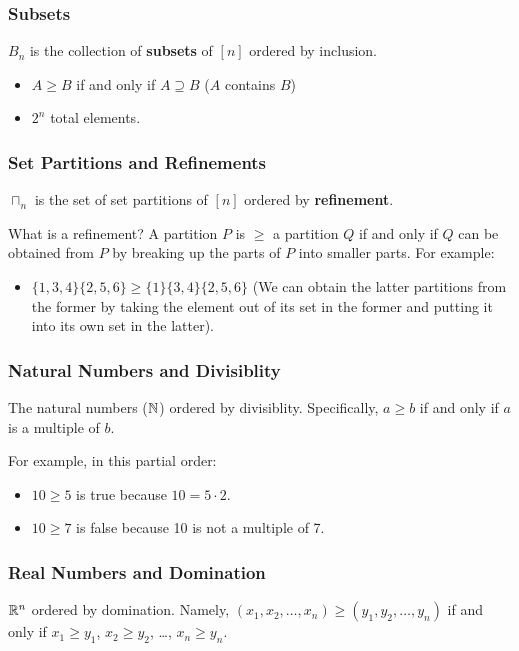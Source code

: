 \documentclass[letterpaper]{article}
\begin{document}
\subsubsection{Subsets}
$B_n$ is the collection of \textbf{subsets} of $[n]$ ordered by inclusion. 
\begin{itemize}
    \item $A \geq B$ if and only if $A \supseteq B$ ($A$ contains $B$)
    \item $2^n$ total elements. 
\end{itemize}

\subsubsection{Set Partitions and Refinements}
$\sqcap_n$ is the set of set partitions of $[n]$ ordered by \textbf{refinement}. 

\bigskip 

What is a refinement? A partition $P$ is $\geq$ a partition $Q$ if and only if $Q$ can be obtained from $P$ by breaking up the parts of $P$ into smaller parts. For example:
\begin{itemize}
    \item $\{1, 3, 4\}\{2, 5, 6\} \geq \{1\} \{3, 4\}\{2, 5, 6\}$ (We can obtain the latter partitions from the former by taking the element  out of its set in the former and putting it into its own set in the latter). 
\end{itemize}

\subsubsection{Natural Numbers and Divisiblity}
The natural numbers ($\mathbb{N}$) ordered by divisiblity. Specifically, $a \geq b$ if and only if $a$ is a multiple of $b$.

\bigskip 

For example, in this partial order:
\begin{itemize}
    \item $10 \geq 5$ is true because $10 = 5 \cdot 2$. 
    \item $10 \geq 7$ is false because 10 is not a multiple of 7.
\end{itemize}

\subsubsection{Real Numbers and Domination}
$\mathbb{R}^n$ ordered by domination. Namely, $(x_1, x_2, \dots, x_n) \geq (y_1, y_2, \dots, y_n)$ if and only if $x_1 \geq y_1$, $x_2 \geq y_2$, \dots, $x_n \geq y_n$. 
\end{document}
